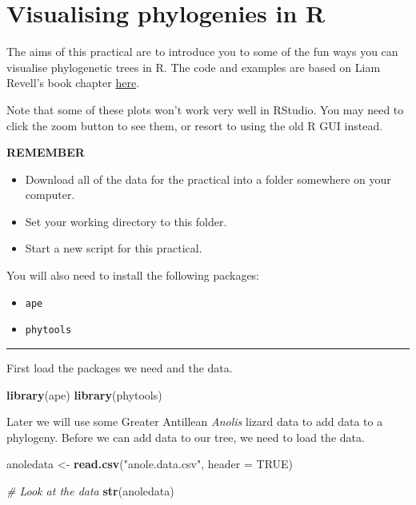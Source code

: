 \documentclass[]{book}
\newenvironment{Shaded}{\begin{snugshade}}{\end{snugshade}}
\newcommand{\KeywordTok}[1]{\textcolor[rgb]{0.13,0.29,0.53}{\textbf{{#1}}}}
\newcommand{\DataTypeTok}[1]{\textcolor[rgb]{0.13,0.29,0.53}{{#1}}}
\newcommand{\StringTok}[1]{\textcolor[rgb]{0.31,0.60,0.02}{{#1}}}
\newcommand{\CommentTok}[1]{\textcolor[rgb]{0.56,0.35,0.01}{\textit{{#1}}}}
\newcommand{\OtherTok}[1]{\textcolor[rgb]{0.56,0.35,0.01}{{#1}}}
\newcommand{\NormalTok}[1]{{#1}}
\providecommand{\tightlist}{%
  \setlength{\itemsep}{0pt}\setlength{\parskip}{0pt}}
\theoremstyle{definition}
\theoremstyle{definition}
\theoremstyle{definition}
\theoremstyle{remark}
\begin{document}
\chapter{Visualising phylogenies in
R}\label{visualising-phylogenies-in-r}

The aims of this practical are to introduce you to some of the fun ways
you can visualise phylogenetic trees in R. The code and examples are
based on Liam Revell's book chapter
\href{http://faculty.umb.edu/liam.revell/pdfs/Revell_2014.MPCM-chapter.pdf}{here}.

Note that some of these plots won't work very well in RStudio. You may
need to click the zoom button to see them, or resort to using the old R
GUI instead.

\textbf{REMEMBER}

\begin{itemize}
\tightlist
\item
  Download all of the data for the practical into a folder somewhere on
  your computer.
\item
  Set your working directory to this folder.
\item
  Start a new script for this practical.
\end{itemize}

You will also need to install the following packages:

\begin{itemize}
\tightlist
\item
  \texttt{ape}
\item
  \texttt{phytools}
\end{itemize}

\begin{center}\rule{0.5\linewidth}{\linethickness}\end{center}

First load the packages we need and the data.

\begin{Shaded}
\begin{Highlighting}[]
\KeywordTok{library}\NormalTok{(ape)}
\KeywordTok{library}\NormalTok{(phytools)}
\end{Highlighting}
\end{Shaded}

Later we will use some Greater Antillean \emph{Anolis} lizard data to
add data to a phylogeny. Before we can add data to our tree, we need to
load the data.

\begin{Shaded}
\begin{Highlighting}[]
\NormalTok{anoledata <-}\StringTok{ }\KeywordTok{read.csv}\NormalTok{(}\StringTok{"anole.data.csv"}\NormalTok{, }\DataTypeTok{header =} \OtherTok{TRUE}\NormalTok{)}

\CommentTok{# Look at the data}
\KeywordTok{str}\NormalTok{(anoledata)}
\end{Highlighting}
\end{Shaded}
\end{document}
